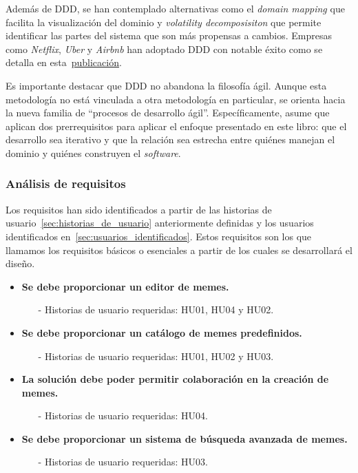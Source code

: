 Además de DDD, se han contemplado alternativas como el \textit{domain mapping} que facilita la visualización del dominio y \textit{volatility decomposisiton} que permite identificar las partes del sistema que son más propensas a cambios. Empresas como \textit{Netflix}, \textit{Uber} y \textit{Airbnb} han adoptado DDD con notable éxito como se detalla en esta~\href{https://blog.bitsrc.io demystifying-domain-driven-design-ddd-in-modern-software-architecture-b57e27c210f7}{publicación}.

Es importante destacar que DDD no abandona la filosofía ágil. Aunque esta metodología no está vinculada a otra metodología en particular, se orienta hacia la nueva familia de ``procesos de desarrollo ágil''. Específicamente, asume que aplican dos prerrequisitos para aplicar el enfoque presentado en este libro: que el desarrollo sea iterativo y que la relación sea estrecha entre quiénes manejan el dominio y quiénes construyen el \textit{software}.

\subsubsection{Análisis de requisitos}

Los requisitos han sido identificados a partir de las historias de usuario~\ref{sec:historias_de_usuario} anteriormente definidas y los usuarios identificados en~\ref{sec:usuarios_identificados}. Estos requisitos son los que llamamos los requisitos básicos o esenciales a partir de los cuales se desarrollará el diseño.

\begin{itemize}
    \item \textbf{Se debe proporcionar un editor de memes.}
    \begin{itemize}
        \item[-] Historias de usuario requeridas: HU01, HU04 y HU02.
    \end{itemize}
    \item \textbf{Se debe proporcionar un catálogo de memes predefinidos.}
    \begin{itemize}
        \item[-] Historias de usuario requeridas: HU01, HU02 y HU03.
    \end{itemize}
    \item \textbf{La solución debe poder permitir colaboración en la creación de memes.}
    \begin{itemize}
        \item[-] Historias de usuario requeridas: HU04.
    \end{itemize}
    \item \textbf{Se debe proporcionar un sistema de búsqueda avanzada de memes.}
    \begin{itemize}
        \item[-] Historias de usuario requeridas: HU03.
    \end{itemize} 
\end{itemize}

